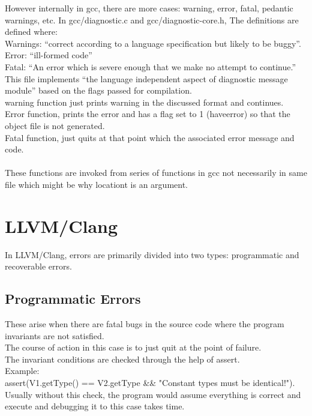 \documentclass[12pt]{article}
\begin{document}
However internally in gcc, there are more cases: warning, error, fatal, pedantic warnings, etc.
In gcc/diagnostic.c and gcc/diagnostic-core.h,
The definitions are defined where:\\
Warnings: “correct according to a language specification but likely to be buggy”.\\
Error: “ill-formed code”\\
Fatal: “An error which is severe enough that we make no attempt to continue.”\\
This file implements “the language independent aspect of diagnostic message module” based on the flags passed for compilation.\\

warning function just prints warning in the discussed format and continues.\\
Error function, prints the error and has a flag set to 1 (have\textunderscore error) so that the object file is not generated.\\
Fatal function, just quits at that point which the associated error message and code.\\
\\
These functions are invoked from series of functions in gcc not necessarily in same file which might be why location\textunderscore t is an argument.
\section{LLVM/Clang}
In LLVM/Clang, errors are primarily divided into two types: programmatic and recoverable errors.
\subsection{Programmatic Errors}
These arise when there are fatal bugs in the source code where the program invariants are not satisfied.\\
The course of action in this case is to just quit at the point of failure.\\
The invariant conditions are checked through the help of assert.\\
Example:\\
assert(V1.getType() == V2.getType \&\& "Constant types must be identical!").\\
Usually without this check, the program would assume everything is correct and execute and debugging it to this case takes time.\\
\end{document}
